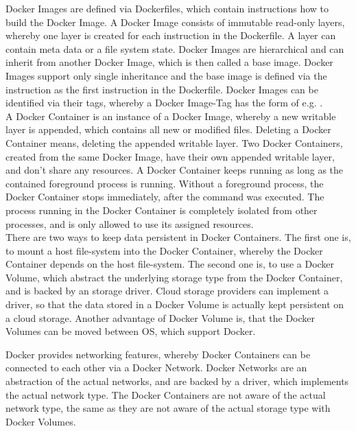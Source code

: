 \label{sec:docker-images}
Docker Images are defined via Dockerfiles, which contain instructions how to build the Docker Image. A Docker Image consists of immutable read-only layers, whereby one layer is created for each instruction in the Dockerfile. A layer can contain meta data or a file system state. Docker Images are hierarchical and can inherit from another Docker Image, which is then called a base image. Docker Images support only single inheritance and the base image is defined via the  instruction as the first instruction in the Dockerfile. Docker Images can be identified via their tags, whereby a Docker Image-Tag has the form of  e.g. . \\

\label{sec:docker-containers}
A Docker Container is an instance of a Docker Image, whereby a new writable layer is appended, which contains all new or modified files. Deleting a Docker Container means, deleting the appended writable layer. Two Docker Containers, created from the same Docker Image, have their own appended writable layer, and don't share any resources. A Docker Container keeps running as long as the contained foreground process is running. Without a foreground process, the Docker Container stops immediately, after the command was executed. The process running in the Docker Container is completely isolated from other processes, and is only allowed to use its assigned resources. \\

\label{sec:docker-volumes}
There are two ways to keep data persistent in Docker Containers. The first one is, to mount a host file-system into the Docker Container, whereby the Docker Container depends on the host file-system. The second one is, to use a Docker Volume, which abstract the underlying storage type from the Docker Container, and is backed by an storage driver. Cloud storage providers can implement a driver, so that the data stored in a Docker Volume is actually kept persistent on a cloud storage. Another advantage of Docker Volume is, that the Docker Volumes can be moved between OS, which support Docker.  

\label{sec:docker-network}
Docker provides networking features, whereby Docker Containers can be connected to each other via a Docker Network. Docker Networks are an abstraction of the actual networks, and are backed by a driver, which implements the actual network type. The Docker Containers are not aware of the actual network type, the same as they are not aware of the actual storage type with Docker Volumes.

